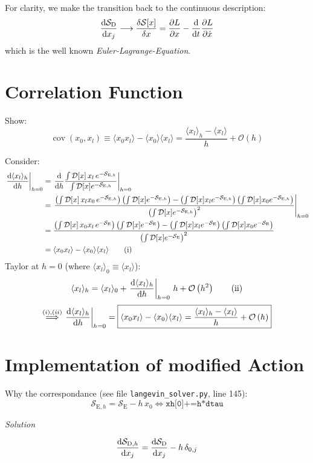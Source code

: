 \documentclass[11pt,a4paper]{scrartcl}
\newcommand{\action}{\ensuremath{\mathcal{S}}}
\newcommand{\SD}{\ensuremath{\mathcal{S}_{\mathrm{D}}}}
\newcommand{\avg}[1]{\langle#1\rangle}
\newcommand{\SE}{\mathcal{S}_{\mathrm{E}}}
\newcommand{\SEh}{\mathcal{S}_{\mathrm{E},h}}
\newcommand{\pathinth}[1]{\int\mathcal{D}[x]#1e^{-\SEh}}
\newcommand{\pathint}[1]{\int\mathcal{D}[x]#1e^{-\SE}}
\newcommand{\BigO}[1]{\mathcal{O}\left(#1\right)}
\DeclareMathOperator{\cov}{cov}
\begin{document}
For clarity, we make the transition back to the continuous description:
\begin{equation*}
    \dv{\SD}{x_j}\longrightarrow\fdv{\mathcal{S}[x]}{x}=\pdv{L}{x}-\dv{t}\pdv{L}{\dot{x}}
\end{equation*}
which is the well known \emph{Euler-Lagrange-Equation}.


\section*{Correlation Function}
Show:
\begin{equation*}
    \cov(x_0, x_l) \equiv \avg{x_0 x_l}-\avg{x_0}\avg{x_l}
    = \frac{\avg{x_l}_h-\avg{x_l}}{h}+\BigO{h}
\end{equation*}

Consider:
\begin{align*}
    \eval{\dv{\avg{x_l}_h}{h}}_{h=0} &=
    \eval{\dv{h}\frac{\pathinth{\,x_l\,}}{\pathinth{}}}_{h=0} \\ &=
    \eval{\frac{\left(\pathinth{\,x_l x_0\,}\right)\left(\pathinth{}\right)
    -\left(\pathinth{x_l}\right)\left(\pathinth{x_0}\right)}
    {\left(\pathinth{}\right)^2}}_{h=0} \\ &=
    \frac{\left(\pathint{\,x_0 x_l\,}\right)\left(\pathint{}\right)
    -\left(\pathint{x_l}\right)\left(\pathint{x_0}\right)}
    {\left(\pathint{}\right)^2} \\ &=
    \avg{x_0 x_l}-\avg{x_0}\avg{x_l} \tag{i}
\end{align*}
Taylor at $h=0$ (where $\avg{x_l}_0\equiv\avg{x_l}$):
\begin{equation*}
    \avg{x_l}_h=\avg{x_l}_0+\eval{\dv{\avg{x_l}_h}{h}}_{h=0}\,h+\BigO{h^2}
    \tag{ii}
\end{equation*}
\begin{equation*}
    \overset{(i),(ii)}{\implies}\eval{\dv{\avg{x_l}_h}{h}}_{h=0}
    =\boxed{\avg{x_0 x_l}-\avg{x_0}\avg{x_l}
    =\frac{\avg{x_l}_h-\avg{x_l}}{h}+\BigO{h}}
\end{equation*}


\section*{Implementation of modified Action}
Why the correspondance (see file \texttt{langevin\_solver.py}, line 145):
\begin{equation*}
    \SEh=\SE-h\,x_0 \iff \texttt{xh[0]+=h*dtau}
\end{equation*}

\emph{Solution}

\begin{equation*}
    \dv{\action_{\mathrm{D}, h}}{x_j}=\dv{\SD}{x_j}-h\,\delta_{0,j}
\end{equation*}
\end{document}
